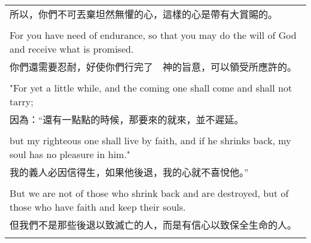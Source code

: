 \begin{tabularx}{\textwidth}{p{}}
所以，你們不可丟棄坦然無懼的心，這樣的心是帶有大賞賜的。 \\ \\
For you have need of endurance, so that you may do the will of God and receive what is promised. \\
你們還需要忍耐，好使你們行完了　神的旨意，可以領受所應許的。 \\ \\
"For yet a little while, and the coming one shall come and shall not tarry; \\
因為：“還有一點點的時候，那要來的就來，並不遲延。 \\ \\
but my righteous one shall live by faith, and if he shrinks back, my soul has no pleasure in him." \\
我的義人必因信得生，如果他後退，我的心就不喜悅他。” \\ \\
But we are not of those who shrink back and are destroyed, but of those who have faith and keep their souls. \\
但我們不是那些後退以致滅亡的人，而是有信心以致保全生命的人。 \\ \\

\hline
\end{tabularx}

\newpage

